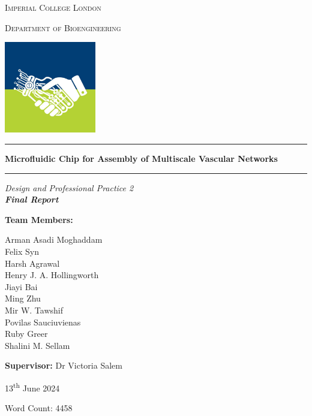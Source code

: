 \documentclass[letterpaper,12pt]{article}
\begin{document}
\begin{titlepage}
    \centering
    {\LARGE\scshape Imperial College London\par}
    
    {\Large\scshape Department of Bioengineering\par}
    
    \vspace{0.3cm}
    \includegraphics[width=0.3\textwidth]{bioeng_logo.jpg}\par %
    
    \rule{\textwidth}{1pt}
    {\huge\bfseries Microfluidic Chip for Assembly of Multiscale Vascular Networks\par}
    \rule{\textwidth}{1pt}

    \vspace{0.3cm}

    
    {\large\itshape Design and Professional Practice 2\\
    \textbf{Final Report}\par}
    \vspace{0.5cm}
    
    {\large \textbf{Team Members:}\par}
    Arman Asadi Moghaddam\\
    Felix Syn\\
    Harsh Agrawal\\
    Henry J. A. Hollingworth\\
    Jiayi Bai\\
    Ming Zhu\\
    Mir W. Tawshif\\
    Povilas Sauciuvienas\\
    Ruby Greer\\
    Shalini M. Sellam\par
    
    \vspace{0.7cm}
    
    {\textbf{Supervisor:} Dr Victoria Salem}

    \vfill
    13\textsuperscript{th} June 2024\par
    Word Count: 4458\par
\end{titlepage}
\end{document}
